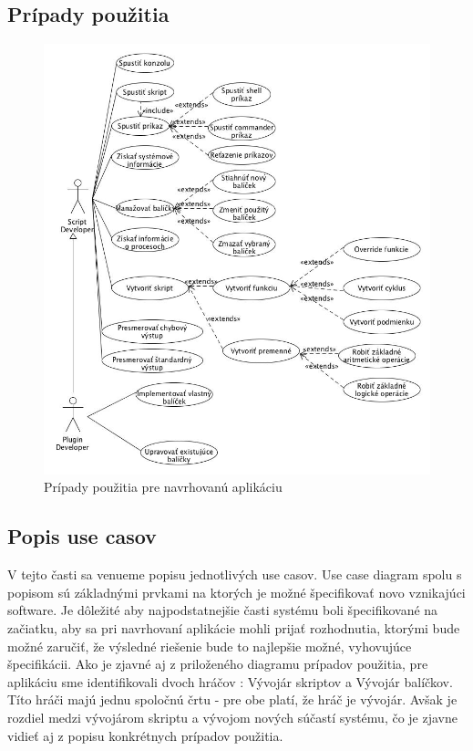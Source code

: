 \subsection{Prípady použitia}
\begin{figure}[!htbp]
	\centering
	\includegraphics[width=\linewidth]{img/usecase.jpg}
	\caption{Prípady použitia pre navrhovanú aplikáciu}
	\label{fig:test}
\end{figure}
\newpage
\subsection{Popis use casov}
\indent V tejto časti sa venueme popisu jednotlivých use casov. Use case diagram spolu s popisom sú základnými prvkami na ktorých je možné špecifikovať novo vznikajúci software. Je dôležité aby najpodstatnejšie časti systému boli špecifikované na začiatku, aby sa pri navrhovaní aplikácie mohli prijať rozhodnutia, ktorými bude možné zaručiť, že výsledné riešenie bude to najlepšie možné, vyhovujúce špecifikácii. Ako je zjavné aj z priloženého diagramu prípadov použitia, pre aplikáciu sme identifikovali dvoch hráčov : Vývojár skriptov a Vývojár balíčkov. Títo hráči majú jednu spoločnú črtu - pre obe platí, že hráč je vývojár. Avšak je rozdiel medzi vývojárom skriptu a vývojom nových súčastí systému, čo je zjavne vidieť aj z popisu konkrétnych prípadov použitia.

